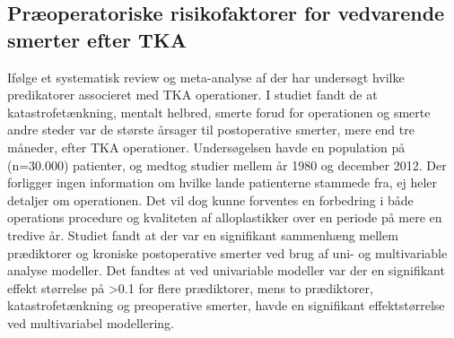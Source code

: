 \subsection{Præoperatoriske risikofaktorer for vedvarende smerter efter TKA}

Ifølge et systematisk review og meta-analyse af \cite{Lewis2015} der har undersøgt hvilke predikatorer associeret med TKA operationer. I studiet fandt de at katastrofetænkning, mentalt helbred, smerte forud for operationen og smerte andre steder var de største årsager til postoperative smerter, mere end tre måneder, efter TKA operationer. Undersøgelsen havde en population på (n=30.000) patienter, og medtog studier mellem år 1980 og december 2012.\citep{Lewis2015} Der forligger ingen information om hvilke lande patienterne stammede fra, ej heler detaljer om operationen. Det vil dog kunne forventes en forbedring i både operations procedure og kvaliteten af alloplastikker over en periode på mere en tredive år. Studiet fandt at der var en signifikant sammenhæng mellem prædiktorer og kroniske postoperative smerter ved brug af uni- og multivariable analyse modeller.\citep{Lewis2015} Det fandtes at ved univariable modeller var der en signifikant effekt størrelse på >0.1 for flere prædiktorer, mens to prædiktorer, katastrofetænkning og preoperative smerter, havde en signifikant effektstørrelse ved multivariabel modellering.\citep{Lewis2015} 


%
%


	
%

